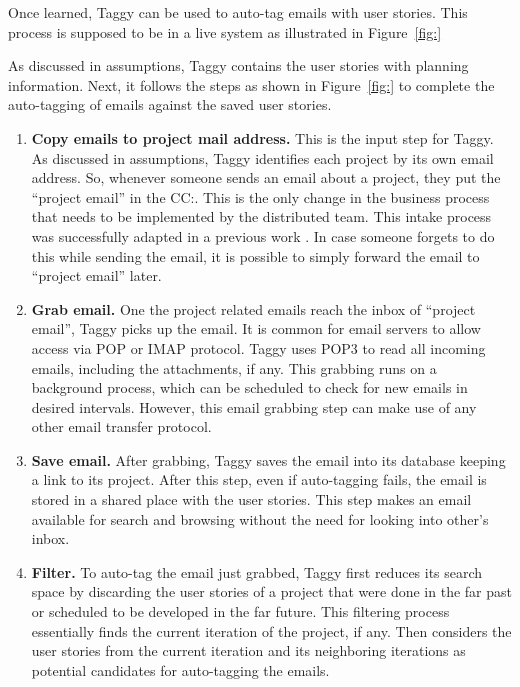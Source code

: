 Once learned, Taggy can be used to auto-tag emails with user stories. This process is supposed to be in a live system as illustrated in Figure~\ref{fig:}

As discussed in assumptions, Taggy contains the user stories with planning information. Next, it follows the steps as shown in Figure~\ref{fig:} to complete the auto-tagging of emails against the saved user stories.

\begin{enumerate}
	\item \textbf{Copy emails to project mail address.} This is the input step for Taggy. As discussed in assumptions, Taggy identifies each project by its own email address. So, whenever someone sends an email about a project, they put the ``project email'' in the CC:. This is the only change in the business process that needs to be implemented by the distributed team. This intake process was successfully adapted in a previous work \cite{where_did_you}. In case someone forgets to do this while sending the email, it is possible to simply forward the email to ``project email'' later.
	
	\item \textbf{Grab email.} One the project related emails reach the inbox of ``project email'', Taggy picks up the email. It is common for email servers to allow access via POP or IMAP protocol. Taggy uses POP3 to read all incoming emails, including the attachments, if any. This grabbing runs on a background process, which can be scheduled to check for new emails in desired intervals. However, this email grabbing step can make use of any other email transfer protocol.

	\item \textbf{Save email.} After grabbing, Taggy saves the email into its database keeping a link to its project. After this step, even if auto-tagging fails, the email is stored in a shared place with the user stories. This step makes an email available for search and browsing without the need for looking into other's inbox.
	
	\item \textbf{Filter.} To auto-tag the email just grabbed, Taggy first reduces its search space by discarding the user stories of a project that were done in the far past or scheduled to be developed in the far future. This filtering process essentially finds the current iteration of the project, if any. Then considers the user stories from the current iteration and its neighboring iterations as potential candidates for auto-tagging the emails.


\end{enumerate}
